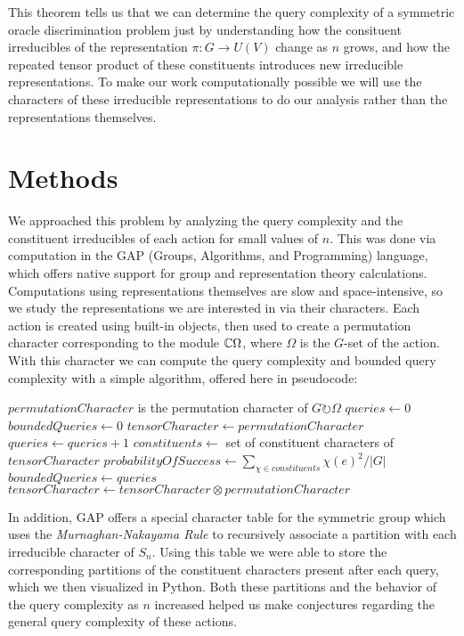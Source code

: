 \documentclass[12pt,twoside]{reedthesis}
\theoremstyle{plain}   %
\theoremstyle{definition}
\theoremstyle{remark}
\numberwithin{equation}{section}
\def\acts{\circlearrowright} %
\begin{document}
  This theorem tells us that we can determine the query complexity of a symmetric oracle discrimination problem just by understanding how the consituent irreducibles of the representation $\pi : G \to U (V)$ change as $n$ grows,
  and how the repeated tensor product of these constituents introduces new irreducible representations.
  To make our work computationally possible we will use the characters of these irreducible representations to do our analysis rather than the representations themselves.
  \chapter{Methods}
  We approached this problem by analyzing the query complexity and the constituent irreducibles of each action for small values of $n$.
  This was done via computation in the GAP (Groups, Algorithms, and Programming) language, which offers native support for group and representation theory calculations.
  Computations using representations themselves are slow and space-intensive, so we study the representations we are interested in via their characters.
  Each action is created using built-in objects, then used to create a permutation character corresponding to the module $\mathbb{C} \Omega$, where $\Omega$ is the $G$-set of the action.
  With this character we can compute the query complexity and bounded query complexity with a simple algorithm, offered here in pseudocode:
  \begin{algorithmic}
\Require $permutationCharacter$ is the permutation character of $G \acts \Omega$
\State $queries \gets 0$
\State $boundedQueries \gets 0$
\State $tensorCharacter \gets permutationCharacter$
\Repeat
\State $queries \gets queries + 1$
\State $constituents \gets$ set of constituent characters of $tensorCharacter$
\State $probabilityOfSuccess \gets \sum_{\chi \in constituents} \chi (e)^2 / |G|$
\State $boundedQueries \gets queries$
\EndIf
\State $tensorCharacter \gets tensorCharacter \otimes permutationCharacter$
\EndProcedure
  \end{algorithmic}
  \newpage
  In addition, GAP offers a special character table for the symmetric group which uses the \emph{Murnaghan-Nakayama Rule} to recursively associate a partition with each irreducible character of $S_n$.
  Using this table we were able to store the corresponding partitions of the constituent characters present after each query, which we then visualized in Python.
  Both these partitions and the behavior of the query complexity as $n$ increased helped us make conjectures regarding the general query complexity of these actions.
  
\end{document}
